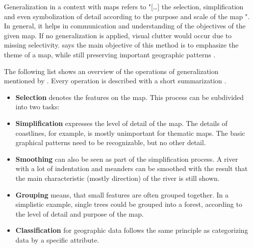 Generalization in a context with maps refers to "[\ldots] the selection, simplification and even symbolization of detail according to the purpose and scale of the map ".
In general, it helps in communication and understanding of the objectives of the given map. If no generalization is applied, visual clutter would occur due to missing selectivity. \citeauthor{Tyner2010} says the main objective of this method is to emphasize the theme of a map, while still preserving important geographic patterns .

The following list shows an overview of the operations of generalization mentioned by \citeauthor{Tyner2010}. Every operation is described with a short summarization .

\begin{itemize}
\item \textbf{Selection} denotes the features on the map. This process can be subdivided into two tasks:


\item \textbf{Simplification} expresses the level of detail of the map. The details of coastlines, for example, is mostly unimportant for thematic maps. The basic graphical patterns need to be recognizable, but no other detail.

\item \textbf{Smoothing} can also be seen as part of the simplification process. A river with a lot of indentation and meanders can be smoothed with the result that the main characteristic (mostly direction) of the river is still shown.

\item \textbf{Grouping} means, that small features are often grouped together. In a simplistic example, single trees could be grouped into a forest, according to the level of detail and purpose of the map.

\item \textbf{Classification} for geographic data follows the same principle as categorizing data by a specific attribute.


\end{itemize}
